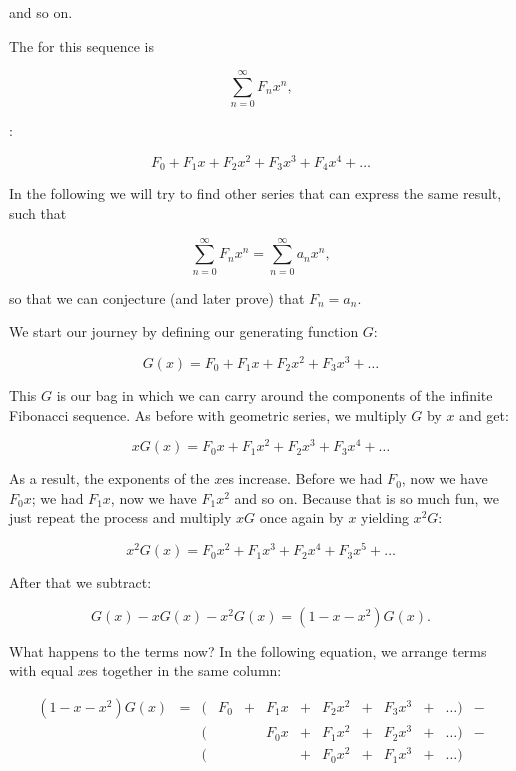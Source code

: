 \documentclass[tikz]{scrreprt}
\begin{document}
and so on.

The  for this sequence is

\[
\sum_{n=0}^{\infty}{F_nx^n},
\]

\ie:

\[
F_0 + F_1x + F_2x^2 + F_3x^3 + F_4x^4 + \dots
\]

In the following we will try to find other series
that can express the same result, such that

\begin{equation}
\sum_{n=0}^{\infty}{F_nx^n} =
\sum_{n=0}^{\infty}{a_nx^n},
\end{equation}

so that we can conjecture (and later prove)
that $F_n = a_n$.

We start our journey by defining our generating function $G$:

\begin{equation}
G(x) = F_0 + F_1x + F_2x^2 + F_3x^3 + \dots
\end{equation}

This $G$ is our bag in which we can carry
around the components of the infinite Fibonacci sequence.
As before with geometric series, we multiply
$G$ by $x$ and get:

\begin{equation}
xG(x) = F_0x + F_1x^2 + F_2x^3 + F_3x^4 + \dots
\end{equation}

As a result, the exponents of the $x$es increase.
Before we had $F_0$, now we have $F_0x$;
we had $F_1x$, now we have $F_1x^2$ and so on.
Because that is so much fun, we just repeat
the process and multiply $xG$ once again
by $x$ yielding $x^2G$:

\begin{equation}
x^2G(x) = F_0x^2 + F_1x^3 + F_2x^4 + F_3x^5 + \dots
\end{equation}

After that we subtract:

\begin{equation}
G(x) - xG(x) - x^2G(x) = (1-x-x^2)G(x).
\end{equation}

What happens to the terms now?
In the following equation, we arrange terms 
with equal $x$es together in the same column:

\begin{align*}
(1-x-x^2)G(x) & = & (&F_0 & + & F_1x & + & F_2x^2 & + & F_3x^3 & + & \dots) & - \\
              &   & (&    &   & F_0x & + & F_1x^2 & + & F_2x^3 & + & \dots) & - \\
              &   & (&    &   &      & + & F_0x^2 & + & F_1x^3 & + & \dots) &
\end{align*}
\end{document}
